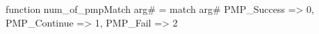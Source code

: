 function num_of_pmpMatch arg# = match arg# {
  PMP_Success => 0,
  PMP_Continue => 1,
  PMP_Fail => 2
}
